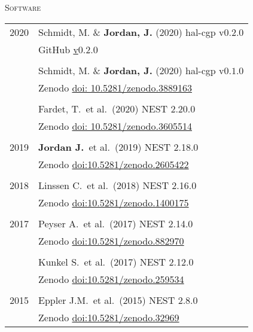 \textsc{Software}
\begin{longtable}{>{\hfill}p{1.6cm} p{}}
  2020 & Schmidt, M. \& \textbf{Jordan, J.} (2020) hal-cgp v$0.2.0$ \\
       & \footnotesize GitHub \href{https://github.com/Happy-Algorithms-League/hal-cgp/releases/tag/0.2.0}{v$0.2.0$} \\
  \multicolumn{2}{c}{} \\
       & Schmidt, M. \& \textbf{Jordan, J.} (2020) hal-cgp v$0.1.0$ \\
       & \footnotesize Zenodo \href{https://doi.org/10.5281/zenodo.3889163}{doi: 10.5281/zenodo.3889163} \\
  \multicolumn{2}{c}{} \\
       & Fardet, T.~et al.~(2020) NEST 2.20.0 \\
       & \footnotesize Zenodo \href{https://doi.org/10.5281/zenodo.3605514}{doi: 10.5281/zenodo.3605514} \\
  \multicolumn{2}{c}{} \\
  2019 & \textbf{Jordan J.}~et al.~(2019) NEST 2.18.0 \\
       & \footnotesize Zenodo \href{https://doi.org/10.5281/zenodo.2605422}{doi:10.5281/zenodo.2605422} \\
  \multicolumn{2}{c}{} \\
  2018 & Linssen C.~et al.~(2018) NEST 2.16.0 \\
       & \footnotesize Zenodo \href{https://doi.org/10.5281/zenodo.1400175}{doi:10.5281/zenodo.1400175} \\
  \multicolumn{2}{c}{} \\
  2017 & Peyser A.~et al.~(2017) NEST 2.14.0 \\
       & \footnotesize Zenodo \href{https://doi.org/10.5281/zenodo.882970}{doi:10.5281/zenodo.882970} \\
  \multicolumn{2}{c}{} \\
  & Kunkel S.~et al.~(2017) NEST 2.12.0 \\
       & \footnotesize Zenodo \href{http://dx.doi.org/10.5281/zenodo.259534}{doi:10.5281/zenodo.259534} \\
  \multicolumn{2}{c}{} \\
  2015 & Eppler J.M.~et al.~(2015) NEST 2.8.0 \\
       & \footnotesize Zenodo \href{http://dx.doi.org/10.5281/zenodo.32969}{doi:10.5281/zenodo.32969}
\end{longtable}

% 

